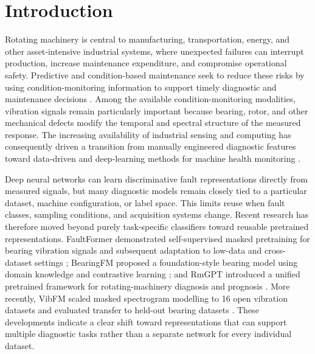 \section{Introduction}
\label{sec:introduction}

Rotating machinery is central to manufacturing, transportation, energy, and other asset-intensive industrial systems, where unexpected failures can interrupt production, increase maintenance expenditure, and compromise operational safety. Predictive and condition-based maintenance seek to reduce these risks by using condition-monitoring information to support timely diagnostic and maintenance decisions \citep{Jardine2006CBM,Nunes2023Challenges}. Among the available condition-monitoring modalities, vibration signals remain particularly important because bearing, rotor, and other mechanical defects modify the temporal and spectral structure of the measured response. The increasing availability of industrial sensing and computing has consequently driven a transition from manually engineered diagnostic features toward data-driven and deep-learning methods for machine health monitoring \citep{Zhao2019DLHealth,Souza2021RotatingDL,Nascimento2022T4PdM}.

Deep neural networks can learn discriminative fault representations directly from measured signals, but many diagnostic models remain closely tied to a particular dataset, machine configuration, or label space. This limits reuse when fault classes, sampling conditions, and acquisition systems change. Recent research has therefore moved beyond purely task-specific classifiers toward reusable pretrained representations. FaultFormer demonstrated self-supervised masked pretraining for bearing vibration signals and subsequent adaptation to low-data and cross-dataset settings \citep{Zhou2024FaultFormer}; BearingFM proposed a foundation-style bearing model using domain knowledge and contrastive learning \citep{Lai2024BearingFM}; and RmGPT introduced a unified pretrained framework for rotating-machinery diagnosis and prognosis \citep{Wang2025RmGPT}. More recently, VibFM scaled masked spectrogram modelling to 16 open vibration datasets and evaluated transfer to held-out bearing datasets \citep{Mannone2026VibFM}. These developments indicate a clear shift toward representations that can support multiple diagnostic tasks rather than a separate network for every individual dataset.

